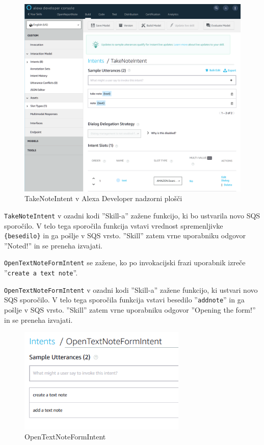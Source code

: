 \documentclass[a4paper, 12pt]{book}
\begin{document}
\begin{figure}[H]
\begin{center}
\includegraphics[width=13cm]{intent_literal}
\end{center}
\caption{TakeNoteIntent v Alexa Developer nadzorni plošči}
\label{TakeNoteIntent}
\end{figure}

\texttt{TakeNoteIntent} v ozadni kodi ''Skill-a'' zažene funkcijo, ki bo ustvarila novo SQS sporočilo.
V telo tega sporočila funkcija vstavi vrednost spremenljivke \texttt{\{besedilo\}} in ga pošlje v SQS vrsto.
''Skill'' zatem vrne uporabniku odgovor ''Noted!'' in se preneha izvajati.

\texttt{OpenTextNoteFormIntent} se zažene, ko po invokacijski frazi uporabnik izreče ''\texttt{create a text note}''.

\texttt{OpenTextNoteFormIntent} v ozadni kodi ''Skill-a'' zažene funkcijo, ki ustvari novo SQS sporočilo.
V telo tega sporočila funkcija vstavi besedilo ''\texttt{addnote}'' in ga pošlje v SQS vrsto.
''Skill'' zatem vrne uporabniku odgovor ''Opening the form!'' in se preneha izvajati.


\begin{figure}[H]
\begin{center}
\includegraphics[width=8cm]{intent_text}
\end{center}
\caption{OpenTextNoteFormIntent}
\label{OpenTextNoteFormIntent}
\end{figure}
\end{document}
